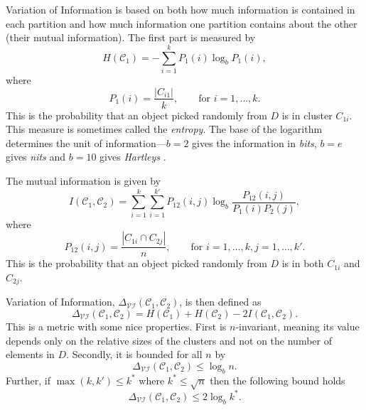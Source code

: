 \documentclass[a4paper]{report}
\newcommand{\dset}{D}
\newcommand{\clus}{\mathcal{C}}
\newcommand{\partcompare}[1]{\Delta_{\mathcal{#1}}(\clus_1,\clus_2)}
\begin{document}
Variation of Information is based on both how much information is contained in
each partition and how much information one partition contains about the other
(their mutual information).  The first part is measured by
\begin{equation*}
  H(\clus_1) = -\sum_{i=1}^{k} P_1(i) \log_b P_1(i),
\end{equation*}
where
\begin{equation*}
  P_1(i) = \frac{|C_{i1}|}{k}, \qquad \text{for $i = 1,\dotsc,k$}.
\end{equation*}
This is the probability that an object picked randomly from $\dset$ is in
cluster $C_{1i}$.  This measure is sometimes called the \textit{entropy}.  The
base of the logarithm determines the unit of information---$b=2$ gives the
information in \textit{bits}, $b=e$ gives \textit{nits} and $b=10$ gives
\textit{Hartleys} \citep{kullback68information}.

The mutual information is given by
\begin{equation*}
  I(\clus_1,\clus_2) = \sum_{i=1}^{k} \sum_{i=1}^{k'}
                      P_{12}(i,j) \log_b \frac{P_{12}(i,j)}{P_1(i)P_2(j)},
\end{equation*}
where
\begin{equation*}
  P_{12}(i,j) = \frac{|C_{1i} \cap C_{2j}|}{n}, \qquad \text{for $i =
    1,\dotsc,k,j = 1,\dotsc,k'$}.
\end{equation*}
This is the probability that an object picked randomly from $\dset$ is in
both $C_{1i}$ and $C_{2j}$.

Variation of Information, $\partcompare{VI}$, is then defined as
\begin{equation*}
  \partcompare{VI} = H(\clus_1) + H(\clus_2) - 2I(\clus_1,\clus_2).
\end{equation*}
This is a metric with some nice properties.  First is $n$-invariant, meaning
its value depends only on the relative sizes of the clusters and not on the
number of elements in $\dset$.  Secondly, it is bounded for all $n$ by
\begin{equation*}
  \partcompare{VI} \leq \log_b n.
\end{equation*}
Further, if $\max(k,k') \leq k^*$ where $k^* \leq \sqrt{n}$ then the following
bound holds
\begin{equation*}
  \partcompare{VI} \leq 2 \log_b k^*.
\end{equation*}
\end{document}
